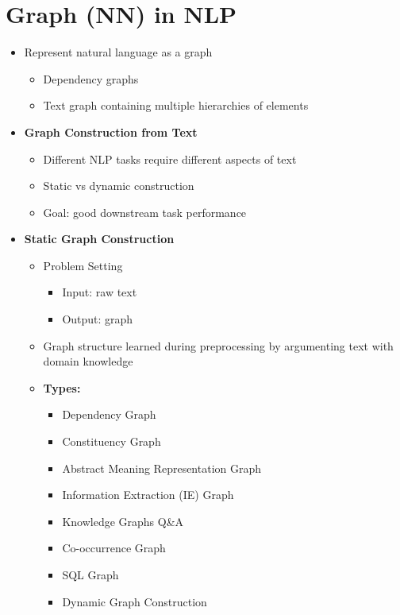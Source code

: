 \section{Graph (NN) in NLP}
\begin{itemize}
    \item Represent natural language as a graph
    \begin{itemize}
        \item Dependency graphs
        \item Text graph containing multiple hierarchies of elements
    \end{itemize}
    \item \textbf{Graph Construction from Text}
    \begin{itemize}
        \item Different NLP tasks require different aspects of text
        \item Static vs dynamic construction
        \item Goal: good downstream task performance
    \end{itemize}
    \item \textbf{Static Graph Construction}
    \begin{itemize}
        \item Problem Setting
        \begin{itemize}
            \item Input: raw text
            \item Output: graph
        \end{itemize}
        \item Graph structure learned during preprocessing by argumenting text with domain knowledge
        \item \textbf{Types:}
        \begin{itemize}
            \item Dependency Graph
            \item Constituency Graph
            \item Abstract Meaning Representation Graph
            \item Information Extraction (IE) Graph
            \item Knowledge Graphs Q\&A
            \item Co-occurrence Graph 
            \item SQL Graph
            \item Dynamic Graph Construction
        \end{itemize}
    \end{itemize}
    

\end{itemize}
